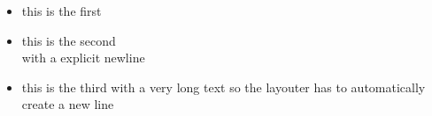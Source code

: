 \begin{itemize}
\item this is the first
\item this is the second\\
	with a explicit newline
\item this is the third with a very long text so the layouter has to automatically create a new line
\end{itemize}
